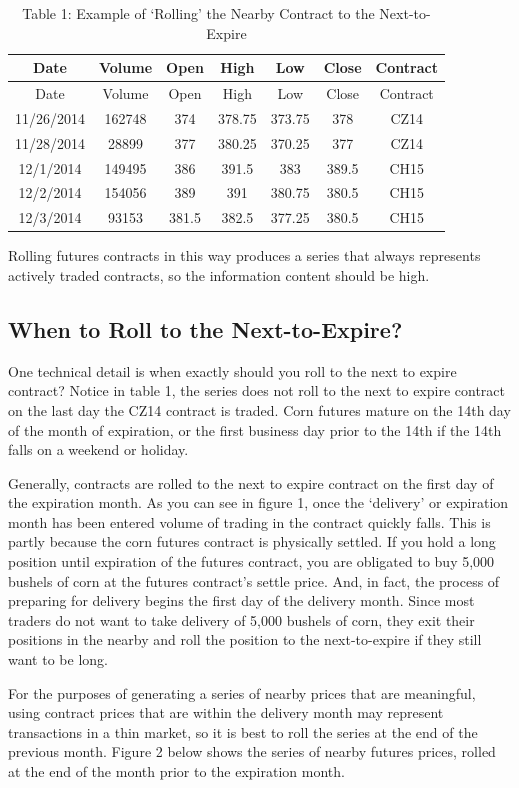 \documentclass[]{book}
\theoremstyle{definition}
\theoremstyle{definition}
\theoremstyle{remark}
\begin{document}
\begin{longtable}[]{@{}ccccccc@{}}
\caption{Table 1: Example of `Rolling' the Nearby Contract to the
Next-to-Expire}\tabularnewline
\toprule
Date & Volume & Open & High & Low & Close & Contract\tabularnewline
\midrule
\endfirsthead
\toprule
Date & Volume & Open & High & Low & Close & Contract\tabularnewline
\midrule
\endhead
11/26/2014 & 162748 & 374 & 378.75 & 373.75 & 378 & CZ14\tabularnewline
11/28/2014 & 28899 & 377 & 380.25 & 370.25 & 377 & CZ14\tabularnewline
12/1/2014 & 149495 & 386 & 391.5 & 383 & 389.5 & CH15\tabularnewline
12/2/2014 & 154056 & 389 & 391 & 380.75 & 380.5 & CH15\tabularnewline
12/3/2014 & 93153 & 381.5 & 382.5 & 377.25 & 380.5 & CH15\tabularnewline
\bottomrule
\end{longtable}

Rolling futures contracts in this way produces a series that always
represents actively traded contracts, so the information content should
be high.

\subsection{When to Roll to the
Next-to-Expire?}\label{when-to-roll-to-the-next-to-expire}

One technical detail is when exactly should you roll to the next to
expire contract? Notice in table 1, the series does not roll to the next
to expire contract on the last day the CZ14 contract is traded. Corn
futures mature on the 14th day of the month of expiration, or the first
business day prior to the 14th if the 14th falls on a weekend or
holiday.

Generally, contracts are rolled to the next to expire contract on the
first day of the expiration month. As you can see in figure 1, once the
`delivery' or expiration month has been entered volume of trading in the
contract quickly falls. This is partly because the corn futures contract
is physically settled. If you hold a long position until expiration of
the futures contract, you are obligated to buy 5,000 bushels of corn at
the futures contract's settle price. And, in fact, the process of
preparing for delivery begins the first day of the delivery month. Since
most traders do not want to take delivery of 5,000 bushels of corn, they
exit their positions in the nearby and roll the position to the
next-to-expire if they still want to be long.

For the purposes of generating a series of nearby prices that are
meaningful, using contract prices that are within the delivery month may
represent transactions in a thin market, so it is best to roll the
series at the end of the previous month. Figure 2 below shows the series
of nearby futures prices, rolled at the end of the month prior to the
expiration month.
\end{document}
